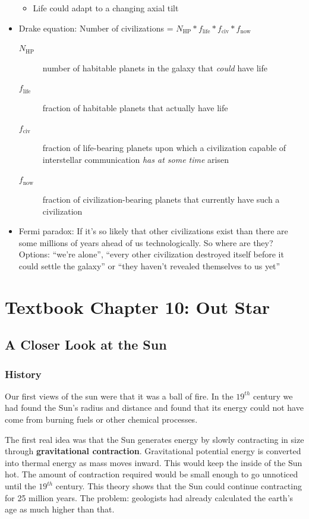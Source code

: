 \documentclass[12pt]{article}
\begin{document}
\begin{itemize}
\begin{itemize}
\item Life could adapt to a changing axial tilt
\end{itemize}
\item Drake equation: Number of civilizations = $N_\text{HP} * f_\text{life} * f_\text{civ} * f_\text{now}$
\begin{description}
\item[$N_\text{HP}$] number of habitable planets in the galaxy that \emph{could} have life
\item[$f_\text{life}$] fraction of habitable planets that actually have life
\item[$f_\text{civ}$] fraction of life-bearing planets upon which a civilization capable of interstellar communication \emph{has at some time} arisen
\item[$f_\text{now}$] fraction of civilization-bearing planets that currently have such a civilization
\end{description}
\item Fermi paradox: If it's so likely that other civilizations exist than there are some millions of years ahead of us technologically.  So where are they?  Options: ``we're alone'', ``every other civilization destroyed itself before it could settle the galaxy'' or ``they haven't revealed themselves to us yet''
\end{itemize}

\section{Textbook Chapter 10: Out Star}
\subsection{A Closer Look at the Sun}
\subsubsection{History}
Our first views of the sun were that it was a ball of fire. In the $19^{th}$ century we had found the Sun's radius and distance and found that its energy could not have come from burning fuels or other chemical processes.

The first real idea was that the Sun generates energy by slowly contracting in size through \textbf{gravitational contraction}. Gravitational potential energy is converted into thermal energy as mass moves inward. This would keep the inside of the Sun hot. The amount of contraction required would be small enough to go unnoticed until the $19^{th}$ century. This theory shows that the Sun could continue contracting for 25 million years. The problem: geologists had already calculated the earth's age as much higher than that.
\end{document}
